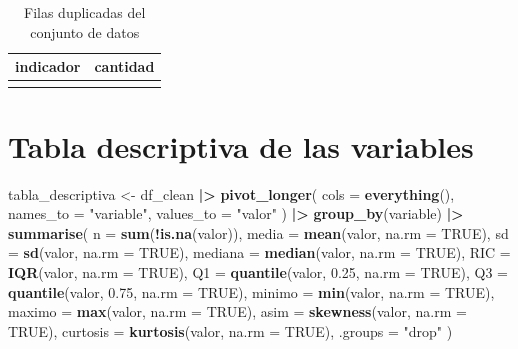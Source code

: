 \documentclass[
]{book}
\newenvironment{Shaded}{\begin{snugshade}}{\end{snugshade}}
\newcommand{\AttributeTok}[1]{\textcolor[rgb]{0.13,0.29,0.53}{#1}}
\newcommand{\ConstantTok}[1]{\textcolor[rgb]{0.56,0.35,0.01}{#1}}
\newcommand{\FloatTok}[1]{\textcolor[rgb]{0.00,0.00,0.81}{#1}}
\newcommand{\FunctionTok}[1]{\textcolor[rgb]{0.13,0.29,0.53}{\textbf{#1}}}
\newcommand{\NormalTok}[1]{#1}
\newcommand{\OtherTok}[1]{\textcolor[rgb]{0.56,0.35,0.01}{#1}}
\newcommand{\SpecialCharTok}[1]{\textcolor[rgb]{0.81,0.36,0.00}{\textbf{#1}}}
\newcommand{\StringTok}[1]{\textcolor[rgb]{0.31,0.60,0.02}{#1}}
\begin{document}
\begin{table}[!h]
\centering
\caption{\label{tab:calidad-datos}Filas duplicadas del conjunto de datos}
\centering
\begin{tabular}[t]{l|r}
\hline
indicador & cantidad\\
\hline
\cellcolor{gray!10}{Filas duplicadas} & \cellcolor{gray!10}{25}\\
\hline
\end{tabular}
\end{table}

\section{Tabla descriptiva de las variables}\label{tabla-descriptiva-de-las-variables}

\begin{Shaded}
\begin{Highlighting}[]
\NormalTok{tabla\_descriptiva }\OtherTok{\textless{}{-}}\NormalTok{ df\_clean }\SpecialCharTok{|\textgreater{}}
  \FunctionTok{pivot\_longer}\NormalTok{(}
    \AttributeTok{cols =} \FunctionTok{everything}\NormalTok{(),}
    \AttributeTok{names\_to =} \StringTok{"variable"}\NormalTok{,}
    \AttributeTok{values\_to =} \StringTok{"valor"}
\NormalTok{  ) }\SpecialCharTok{|\textgreater{}}
  \FunctionTok{group\_by}\NormalTok{(variable) }\SpecialCharTok{|\textgreater{}}
  \FunctionTok{summarise}\NormalTok{(}
    \AttributeTok{n =} \FunctionTok{sum}\NormalTok{(}\SpecialCharTok{!}\FunctionTok{is.na}\NormalTok{(valor)),}
    \AttributeTok{media =} \FunctionTok{mean}\NormalTok{(valor, }\AttributeTok{na.rm =} \ConstantTok{TRUE}\NormalTok{),}
    \AttributeTok{sd =} \FunctionTok{sd}\NormalTok{(valor, }\AttributeTok{na.rm =} \ConstantTok{TRUE}\NormalTok{),}
    \AttributeTok{mediana =} \FunctionTok{median}\NormalTok{(valor, }\AttributeTok{na.rm =} \ConstantTok{TRUE}\NormalTok{),}
    \AttributeTok{RIC =} \FunctionTok{IQR}\NormalTok{(valor, }\AttributeTok{na.rm =} \ConstantTok{TRUE}\NormalTok{),}
    \AttributeTok{Q1 =} \FunctionTok{quantile}\NormalTok{(valor, }\FloatTok{0.25}\NormalTok{, }\AttributeTok{na.rm =} \ConstantTok{TRUE}\NormalTok{),}
    \AttributeTok{Q3 =} \FunctionTok{quantile}\NormalTok{(valor, }\FloatTok{0.75}\NormalTok{, }\AttributeTok{na.rm =} \ConstantTok{TRUE}\NormalTok{),}
    \AttributeTok{minimo =} \FunctionTok{min}\NormalTok{(valor, }\AttributeTok{na.rm =} \ConstantTok{TRUE}\NormalTok{),}
    \AttributeTok{maximo =} \FunctionTok{max}\NormalTok{(valor, }\AttributeTok{na.rm =} \ConstantTok{TRUE}\NormalTok{),}
    \AttributeTok{asim =} \FunctionTok{skewness}\NormalTok{(valor, }\AttributeTok{na.rm =} \ConstantTok{TRUE}\NormalTok{),}
    \AttributeTok{curtosis =} \FunctionTok{kurtosis}\NormalTok{(valor, }\AttributeTok{na.rm =} \ConstantTok{TRUE}\NormalTok{),}
    \AttributeTok{.groups =} \StringTok{"drop"}
\NormalTok{  )}


\end{Highlighting}
\end{Shaded}
\end{document}
